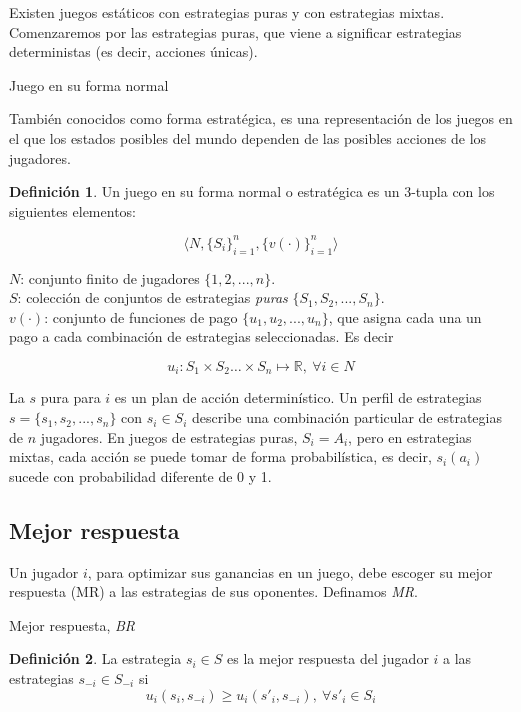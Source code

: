 \documentclass[12pt]{scrartcl}
\theoremstyle{definition}
\newtheorem{defi}{Definición}[section]
\begin{document}
Existen juegos estáticos con estrategias puras y con estrategias mixtas. Comenzaremos por las estrategias puras, que viene a significar estrategias deterministas (es decir, acciones únicas).

\begin{mybox}{Juego en su forma normal}

También conocidos como forma estratégica, es una representación de los juegos en el que los estados posibles del mundo dependen de las posibles acciones de los jugadores.

	\begin{defi}
		Un juego en su forma normal o estratégica es un 3-tupla con los siguientes elementos:
		
		\[ \big\langle N, \{S_i\}_{i=1}^n, \{v(\cdot)\}_{i=1}^n \big\rangle\]
		
		$N$: conjunto finito de jugadores $\{1, 2, ..., n\}$.\\
		$S$: colección de conjuntos de estrategias \textit{puras} $ \{S_1, S_2, ..., S_n\} $.\\
		$v(\cdot)$: conjunto de funciones de pago $ \{u_1, u_2,...,u_n\} $, que asigna cada una un pago a cada combinación de estrategias seleccionadas. Es decir
		
		\[ u_i\colon S_1 \times S_2 \dots \times S_n \mapsto \mathbb{R},\ \forall i \in N\]
			
	\end{defi}
\end{mybox}

La $s$ pura para $i$ es un plan de acción determinístico. Un perfil de estrategias $s=\{s_1, s_2, ..., s_n \}$ con $s_i \in S_i$ describe una combinación particular de estrategias de $n$ jugadores. En juegos de estrategias puras, $S_i = A_i$, pero en estrategias mixtas, cada acción se puede tomar de forma probabilística, es decir, $s_i(a_i)$ sucede con probabilidad diferente de 0 y 1.

\subsection{Mejor respuesta}

Un jugador $i$, para optimizar sus ganancias en un juego, debe escoger su mejor respuesta (MR) a las estrategias de sus oponentes. Definamos \textit{MR}.

\begin{mybox}{Mejor respuesta, \textit{BR}}
	\begin{defi}
		La estrategia $s_i \in S$ es la mejor respuesta del jugador $i$ a las estrategias $s_{-i} \in S_{-i}$ si
		\[ u_i(s_i, s_{-i})\geq u_i(s'_i, s_{-i}),\ \forall s'_i \in S_i \] 
	\end{defi}
\end{mybox}
\end{document}
